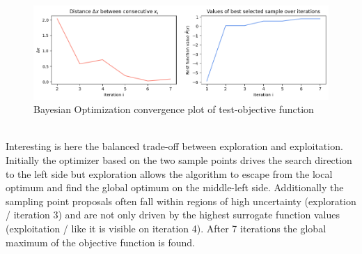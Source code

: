 \documentclass[12pt, a4paper]{article}
\begin{document}
\begin{figure}[!htpb]
    \centering
    \includegraphics[width=1\textwidth,trim={0 0 0 0},clip]{figures/bayesian_optimization_from_scratch_convergence_plot.png}
    \caption[Bayesian Optimization convergence plot]{Bayesian Optimization convergence plot of test-objective function}
    \label{fig: bo_convergence_plot}    
\end{figure}
\\
Interesting is here the balanced trade-off between exploration and exploitation. Initially the optimizer based on the two sample points drives the search direction to the left side but exploration allows the algorithm to escape from the local optimum and find the global optimum on the middle-left side. Additionally the sampling point proposals often fall within regions of high uncertainty (exploration / iteration 3) and are not only driven by the highest surrogate function values (exploitation / like it is visible on iteration 4). After 7 iterations the global maximum of the objective function is found.
\end{document}
